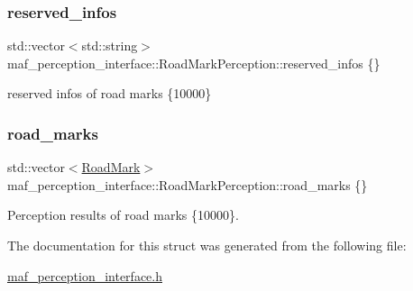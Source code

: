 \subsubsection{\texorpdfstring{reserved\+\_\+infos}{reserved\_infos}}
{\footnotesize\ttfamily std\+::vector$<$std\+::string$>$ maf\+\_\+perception\+\_\+interface\+::\+Road\+Mark\+Perception\+::reserved\+\_\+infos \{\}}



reserved infos of road marks \{10000\} 

\mbox{\label{structmaf__perception__interface_1_1RoadMarkPerception_a8988519fe6bfdf6968a9c2a547935524}} 
\subsubsection{\texorpdfstring{road\+\_\+marks}{road\_marks}}
{\footnotesize\ttfamily std\+::vector$<$\hyperlink{structmaf__perception__interface_1_1RoadMark}{Road\+Mark}$>$ maf\+\_\+perception\+\_\+interface\+::\+Road\+Mark\+Perception\+::road\+\_\+marks \{\}}



Perception results of road marks \{10000\}. 



The documentation for this struct was generated from the following file\+:\begin{DoxyCompactItemize}
\item 
\hyperlink{maf__perception__interface_8h}{maf\+\_\+perception\+\_\+interface.\+h}\end{DoxyCompactItemize}
